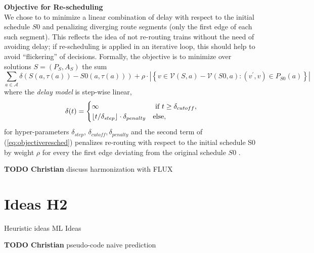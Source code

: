 \documentclass{article}
\DeclarePairedDelimiter{\floor}{\lfloor}{\rfloor}
\begin{document}
\noindent\textbf{Objective for Re-scheduling}
\\
We chose to to minimize a linear combination of delay with respect to the initial schedule $S0$ and penalizing diverging route segments (only the first edge of each such segment). This reflects the idea of not re-routing trains without the need of avoiding delay; if re-scheduling is applied in an iterative loop, this should help to avoid ``flickering'' of decisions.
%
Formally, the objective is to minimize over solutions $S=(P_S,A_S)$  the sum
\begin{equation}
\sum_{a \in \mathcal{A}} \delta\left(S(a,\tau(a)) - S0(a,\tau(a))\right) + \rho \cdot \left|\left\{v \in \mathcal{V}(S,a)-\mathcal{V}(S0,a): (v^\prime,v) \in P_{S0}(a) \right\}\right| \label{eq:objectiveresched}
\end{equation}
where the \emph{delay model} is step-wise linear,
\begin{equation}
\delta(t) =
\begin{cases}
    \infty & \textrm{ if } t \geq \delta_{cutoff},\\
    \floor{t / \delta_{step}} \cdot \delta_{penalty}  & \textrm{else},
\end{cases}
\end{equation}
for hyper-parameters $\delta_{step}$, $\delta_{cutoff}, \delta_{penalty}$
and the second term of (\ref{eq:objectiveresched}) penalizes re-routing with respect to the initial schedule S0 by weight $\rho$ for every the first edge deviating from the original schedule $S0$ .


\begin{mdframed}
{\bf TODO Christian} discuss harmonization with FLUX
\end{mdframed}


\section{Ideas H2}\label{sec:H2}
        Heuristic ideas
        ML Ideas

\begin{mdframed}
{\bf TODO Christian} pseudo-code naive prediction
\end{mdframed}
\end{document}
